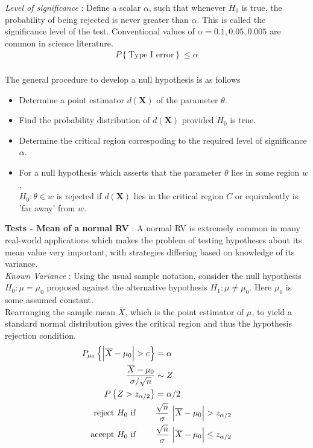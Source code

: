 \textit{Level of significance} : Define a scalar $ \alpha $, such that whenever $ H_0 $ is true, the probability of being rejected is never greater than $ \alpha $. This is called the significance level of the test. Conventional values of $ \alpha = 0.1, 0.05, 0.005 $ are common in science literature.\\

\begin{align}
	P  \left\{\text{Type I error}\right\} \leq \alpha 
\end{align} \\

The general procedure to develop a null hypothesis is as follows \\

\begin{itemize}
	\item Determine a point estimator $ d(\textbf{X}) $ of the parameter $ \theta $.
	\item Find the probability distribution of $ d(\textbf{X}) $ provided $ H_0 $ is true.
	\item Determine the critical region correspoding to the required level of significance $ \alpha $.
	\item For a null hypothesis which asserts that the parameter $ \theta $ lies in some region $ w $, \\
	 $ H_0 : \theta \in w $ is rejected if $ d(\textbf{X}) $ lies in the critical region $ C $ or equivalently is 'far away' from $ w $.
\end{itemize}


\textbf{Tests - Mean of a normal RV} : A normal RV is extremely common in many real-world applications which makes the problem of testing hypotheses about its mean value very important, with strategies differing based on knowledge of its variance. \\

\textit{Known Variance} : Using the usual sample notation, consider the null hypothesis $ H_0 : \mu = \mu_0 $ proposed against the alternative hypothesis $ H_1 : \mu \neq \mu_0 $. Here $ \mu_0 $ is some assumed constant.\\

Rearranging the sample mean $ \overline{X} $, which is the point estimator of $ \mu $, to yield a standard normal distribution gives the critical region and thus the hypothesis rejection condition.
\begin{align}
	P_{\mu_0} \left\{ \Big|\overline{X} - \mu_0\Big|  > c\right\} &= \alpha \\
	\frac{\overline{X} - \mu_0}{\sigma / \sqrt{n}} &\sim Z \nonumber \\
	P \left\{Z > z_{\alpha/2}\right\} &= \alpha/2 \nonumber \\
	\text{reject $ H_0 $ if } \qquad & \frac{\sqrt{n}}{\sigma}\ \Big| \overline{X} - \mu_0 \Big| > z_{\alpha/2} \nonumber \\
	\text{accept $ H_0 $ if } \qquad & \frac{\sqrt{n}}{\sigma}\ \Big| \overline{X} - \mu_0 \Big| \leq z_{\alpha/2}
\end{align} \\


